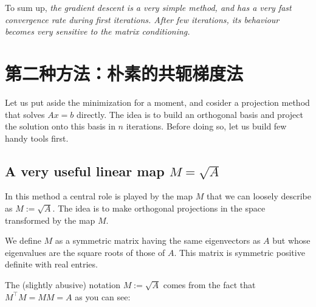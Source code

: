 \documentclass[notitlepage,oneside]{book}
\begin{document}
\vspace{10mm}

To sum up, \textit{the gradient descent is a very simple method, and has a very fast convergence rate during first iterations.
After few iterations, its behaviour becomes very sensitive to the matrix conditioning.}


\section{第二种方法：朴素的共轭梯度法}
\label{chap5:sec:linalg:algo_conjugaison}

Let us put aside the minimization for a moment, and cosider a projection method that solves $Ax=b$ directly.
The idea is to build an orthogonal basis and project the solution onto this basis in $n$ iterations.
Before doing so, let us build few handy tools first.

\subsection{A very useful linear map $M=\sqrt{A}$}
In this method a central role is played by the map $M$ that we can loosely describe as $M:=\sqrt{A}$.
The idea is to make orthogonal projections in the space transformed by the map $M$.

\begin{framed}
We define $M$ as a symmetric matrix having the same eigenvectors as $A$ but whose eigenvalues are the square roots of those of $A$.
This matrix is symmetric positive definite with real entries.
\end{framed}
The (slightly abusive) notation $M := \sqrt{A}$ comes from the fact that $M^\top M=MM=A$ as you can see:
\end{document}
